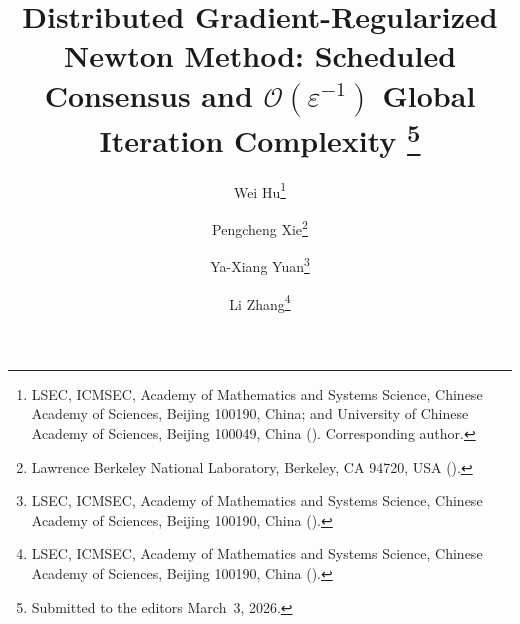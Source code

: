 \newcommand{\creflastconjunction}{, and~}




\title{Distributed Gradient-Regularized Newton Method:
	Scheduled Consensus and \texorpdfstring{$\mathcal{O}(\varepsilon^{-1})$}{O(eps\^{}-1)} Global Iteration Complexity%
	\thanks{Submitted to the editors March~3, 2026.}}

\author{
	Wei Hu\thanks{
		LSEC, ICMSEC, Academy of Mathematics and Systems Science,
		Chinese Academy of Sciences, Beijing 100190, China;
		and University of Chinese Academy of Sciences, Beijing 100049, China
		().
		Corresponding author.
	}
	\and
	Pengcheng Xie\thanks{
		Lawrence Berkeley National Laboratory,
		Berkeley, CA 94720, USA
		().
	}
	\and
	Ya-Xiang Yuan\thanks{
		LSEC, ICMSEC, Academy of Mathematics and Systems Science,
		Chinese Academy of Sciences, Beijing 100190, China
		().
	}
	\and
	Li Zhang\thanks{
		LSEC, ICMSEC, Academy of Mathematics and Systems Science,
		Chinese Academy of Sciences, Beijing 100190, China
		().
	}
}

